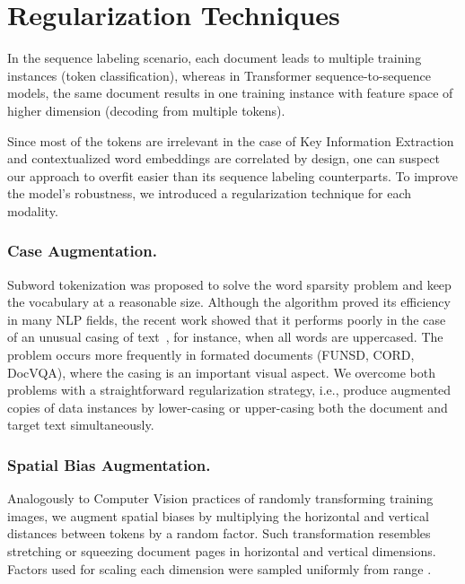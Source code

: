 \documentclass[runningheads]{llncs}
\begin{document}
\section{Regularization Techniques}

In the sequence labeling scenario, each document leads to multiple training instances (token classification), whereas in Transformer sequence-to-sequence models, the same document results in one training instance with feature space of higher dimension (decoding from multiple tokens).

Since most of the tokens are irrelevant in the case of Key Information Extraction and contextualized word embeddings are correlated by design, one can suspect our approach to overfit easier than its sequence labeling counterparts. To improve the model's robustness, we introduced a regularization technique for each modality.

\subsubsection{Case Augmentation.}
Subword tokenization \cite{sennrich-etal-2016-neural,kudo-2018-subword} was proposed to solve the word sparsity problem and keep the vocabulary at a reasonable size. 
Although the algorithm proved its efficiency in many NLP fields, the recent work showed that it performs poorly in the case of an unusual casing of text~\cite{powalski2020unicase}, for instance, when all words are uppercased. The problem occurs more frequently in formated documents (FUNSD, CORD, DocVQA), where the casing is an important visual aspect.
We overcome both problems with a straightforward regularization strategy, i.e., produce augmented copies of data instances by lower-casing or upper-casing both the document and target text simultaneously.





\subsubsection{Spatial Bias Augmentation.}
Analogously to Computer Vision practices of randomly transforming training images, we augment spatial biases by multiplying the horizontal and vertical distances between tokens by a random factor. Such transformation resembles stretching or squeezing document pages in horizontal and vertical dimensions. Factors used for scaling each dimension were sampled uniformly from range .
\end{document}
